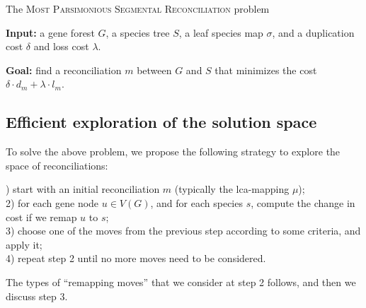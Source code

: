 \documentclass[10pt]{article}
\begin{document}
\medskip

\noindent 
The \textsc{Most Parsimonious Segmental Reconciliation} problem

\noindent 
\textbf{Input:} a gene forest $G$, a species tree $S$, a leaf species map $\sigma$, and a duplication cost $\delta$ and loss cost $\lambda$.

\noindent 
\textbf{Goal:} find a reconciliation $m$ between $G$ and $S$ that minimizes the cost 
$\delta \cdot d_m + \lambda \cdot l_m$.








\subsection*{Efficient exploration of the solution space}

To solve the above problem, we propose the following strategy to explore the space of reconciliations:  

\medskip

) start with an initial reconciliation $m$ (typically the lca-mapping $\mu$); \\
2) for each gene node $u \in V(G)$, and for each species $s$, compute the change in cost if we remap $u$ to $s$; \\
3) choose one of the moves from the previous step according to some criteria, and apply it; \\
4) repeat step 2 until no more moves need to be considered.

\medskip

The types of ``remapping moves'' that we consider at step 2 follows, and then we discuss step 3.
\end{document}
